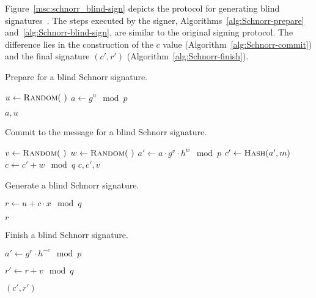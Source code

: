 Figure~\ref{msc:schnorr_blind-sign} depicts the protocol for generating blind
signatures~\cite{PointchevalStern1996}. The steps executed by the signer,
Algorithms~\ref{alg:Schnorr-prepare} and~\ref{alg:Schnorr-blind-sign}, are
similar to the original signing protocol. The difference lies in the
construction of the $c$ value (Algorithm~\ref{alg:Schnorr-commit}) and the final
signature $(c', r')$ (Algorithm~\ref{alg:Schnorr-finish}).

\begin{algorithm}
  \caption{Prepare for a blind Schnorr signature.}
  \label{alg:Schnorr-prepare}
  \addtolength{\baselineskip}{1mm}
  \begin{algorithmic}[1]
      \State $u \gets \Call{Random}{~}$
      \State $a \gets g^u \mod p$

      \Return $a, u$
    \EndFunction
  \end{algorithmic}
\end{algorithm}

\begin{algorithm}
  \caption{Commit to the message for a blind Schnorr signature.}
  \label{alg:Schnorr-commit}
  \addtolength{\baselineskip}{1mm}
  \begin{algorithmic}[1]
      \State $v \gets \Call{Random}{~}$
      \State $w \gets \Call{Random}{~}$
      \State $a' \gets a \cdot g^v \cdot h^w \mod p$
      \State $c' \gets \Call{Hash}{a', m}$
      \State $c \gets c' + w \mod q$
      \Return $c, c', v$
    \EndFunction
  \end{algorithmic}
\end{algorithm}

\begin{algorithm}
  \caption{Generate a blind Schnorr signature.}
  \label{alg:Schnorr-blind-sign}
  \addtolength{\baselineskip}{1mm}
  \begin{algorithmic}[1]
      \State $r \gets u + c \cdot x \mod q$

      \Return $r$
    \EndFunction
  \end{algorithmic}
\end{algorithm}

\begin{algorithm}
  \caption{Finish a blind Schnorr signature.}
  \label{alg:Schnorr-finish}
  \addtolength{\baselineskip}{1mm}
  \begin{algorithmic}[1]
      \State $a' \gets g^r \cdot h^{-c} \mod p$
        \Return {}
      \EndIf

      \State $r' \gets r + v \mod q$

      \Return $(c', r')$
    \EndFunction
  \end{algorithmic}
\end{algorithm}

